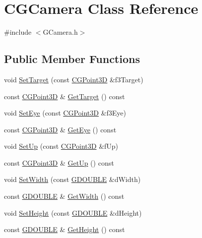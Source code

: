 \hypertarget{class_c_g_camera}{}\section{C\+G\+Camera Class Reference}
\label{class_c_g_camera}


{\ttfamily \#include $<$G\+Camera.\+h$>$}

\subsection*{Public Member Functions}
\begin{DoxyCompactItemize}
\item 
void \hyperlink{class_c_g_camera_aa30f2489089e6b43b6142d92d246a24e}{Set\+Target} (const \hyperlink{class_c_g_point3_d}{C\+G\+Point3\+D} \&f3\+Target)
\item 
const \hyperlink{class_c_g_point3_d}{C\+G\+Point3\+D} \& \hyperlink{class_c_g_camera_aabf0d7b1f8af48eccec2c5cc5a1efe2f}{Get\+Target} () const 
\item 
void \hyperlink{class_c_g_camera_a4e3980059c323effae1c8b20b2335e59}{Set\+Eye} (const \hyperlink{class_c_g_point3_d}{C\+G\+Point3\+D} \&f3\+Eye)
\item 
const \hyperlink{class_c_g_point3_d}{C\+G\+Point3\+D} \& \hyperlink{class_c_g_camera_a46f8a91cc5b9391f8a0e8fd1a60cef19}{Get\+Eye} () const 
\item 
void \hyperlink{class_c_g_camera_ae93a2df8533aa4fb9148677e3adcf6f8}{Set\+Up} (const \hyperlink{class_c_g_point3_d}{C\+G\+Point3\+D} \&f\+Up)
\item 
const \hyperlink{class_c_g_point3_d}{C\+G\+Point3\+D} \& \hyperlink{class_c_g_camera_a0e3b83ef4683a1e12069fb0ecc2562b8}{Get\+Up} () const 
\item 
void \hyperlink{class_c_g_camera_a07a1bdd8f70ec0c41163dd1a9761df1c}{Set\+Width} (const \hyperlink{_g_types_8h_afd05ac85f90ee8e2a733928545462cd4}{G\+D\+O\+U\+B\+L\+E} \&d\+Width)
\item 
const \hyperlink{_g_types_8h_afd05ac85f90ee8e2a733928545462cd4}{G\+D\+O\+U\+B\+L\+E} \& \hyperlink{class_c_g_camera_ac18c78c33ea969bdd76490cad4c11295}{Get\+Width} () const 
\item 
void \hyperlink{class_c_g_camera_a6eea4153d3fd5cfd2c5b87417e1b1809}{Set\+Height} (const \hyperlink{_g_types_8h_afd05ac85f90ee8e2a733928545462cd4}{G\+D\+O\+U\+B\+L\+E} \&d\+Height)
\item 
const \hyperlink{_g_types_8h_afd05ac85f90ee8e2a733928545462cd4}{G\+D\+O\+U\+B\+L\+E} \& \hyperlink{class_c_g_camera_a171cf90a66857be9e1f31199952398ea}{Get\+Height} () const 

\end{DoxyCompactItemize}
